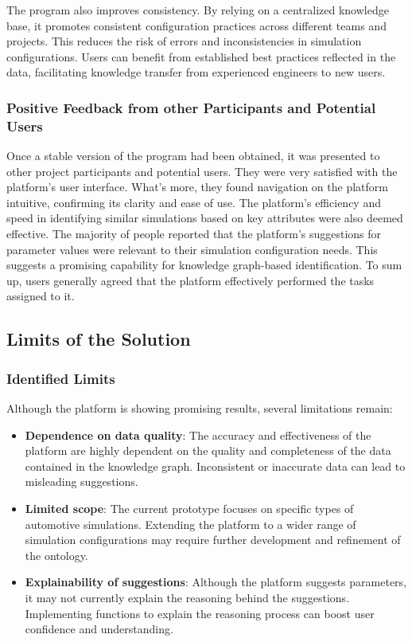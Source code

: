     The program also improves consistency. By relying on a centralized knowledge base, it promotes consistent configuration practices across different teams and projects. This reduces the risk of errors and inconsistencies in simulation configurations. Users can benefit from established best practices reflected in the data, facilitating knowledge transfer from experienced engineers to new users.\\

    
    \subsubsection*{Positive Feedback from other Participants and Potential Users}
    Once a stable version of the program had been obtained, it was presented to other project participants and potential users. They were very satisfied with the platform's user interface. What's more, they found navigation on the platform intuitive, confirming its clarity and ease of use. The platform's efficiency and speed in identifying similar simulations based on key attributes were also deemed effective. The majority of people reported that the platform's suggestions for parameter values were relevant to their simulation configuration needs. This suggests a promising capability for knowledge graph-based identification. To sum up, users generally agreed that the platform effectively performed the tasks assigned to it. 


\subsection{Limits of the Solution}
    \subsubsection*{Identified Limits}
    Although the platform is showing promising results, several limitations remain:
    
    \begin{itemize}
        \item \textbf{Dependence on data quality}:  The accuracy and effectiveness of the platform are highly dependent on the quality and completeness of the data contained in the knowledge graph.  Inconsistent or inaccurate data can lead to misleading suggestions.

        \item \textbf{Limited scope}: The current prototype focuses on specific types of automotive simulations. Extending the platform to a wider range of simulation configurations may require further development and refinement of the ontology.

        \item \textbf{Explainability of suggestions}:  Although the platform suggests parameters, it may not currently explain the reasoning behind the suggestions. Implementing functions to explain the reasoning process can boost user confidence and understanding.
    \end{itemize}

